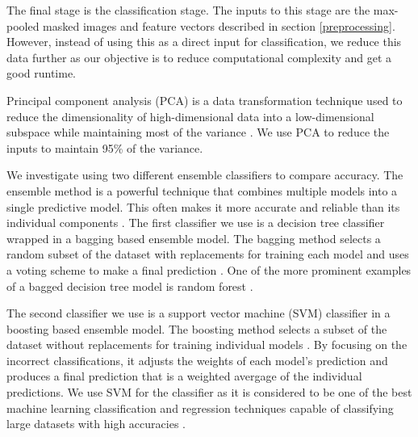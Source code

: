 The final stage is the classification stage. The inputs to this stage are the max-pooled masked images and feature vectors described in section \ref{preprocessing}. However, instead of using this as a direct input for classification, we reduce this data further as our objective is to reduce computational complexity and get a good runtime.

Principal component analysis (PCA) is a data transformation technique used to reduce the dimensionality of high-dimensional data into a low-dimensional subspace while maintaining most of the variance \cite{b5_1,b5_2}. We use PCA to reduce the inputs to maintain 95\% of the variance.

We investigate using two different ensemble classifiers to compare accuracy. The ensemble method is a powerful technique that combines multiple models into a single predictive model. This often makes it more accurate and reliable than its individual components \cite{b5_3}. The first classifier we use is a decision tree classifier wrapped in a bagging based ensemble model. The bagging method selects a random subset of the dataset with replacements for training each model and uses a voting scheme to make a final prediction \cite{b5_4}. One of the more prominent examples of a bagged decision tree model is random forest \cite{b5_5}.

The second classifier we use is a support vector machine (SVM) classifier in a boosting based ensemble model. The boosting method selects a subset of the dataset without replacements for training individual models \cite{b5_6}. By focusing on the incorrect classifications, it adjusts the weights of each model's prediction and produces a final prediction that is a weighted avergage of the individual predictions. We use SVM for the classifier as it is considered to be one of the best machine learning classification and regression techniques capable of classifying large datasets with high accuracies \cite{b5_7,b5_8,b5_9}.